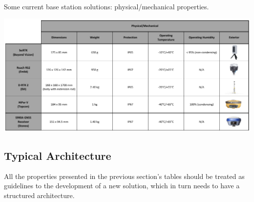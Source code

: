 \begingroup
\begin{table}[H]
    \centering
	\captionsetup{justification=centering}
	\caption{Some current base station solutions: physical/mechanical properties.}
	\includegraphics[width=1.0\textwidth]{Chapters/Figures/curr_solutions/MECH_v2.pdf}
	\label{tab:curr_sol_MECH}
\end{table}
\endgroup


\newpage
\subsection{Typical Architecture}\label{sec:II_architecture}

All the properties presented in the previous section's tables should be treated as guidelines to the development of a new solution, which in turn needs to have a structured architecture.

